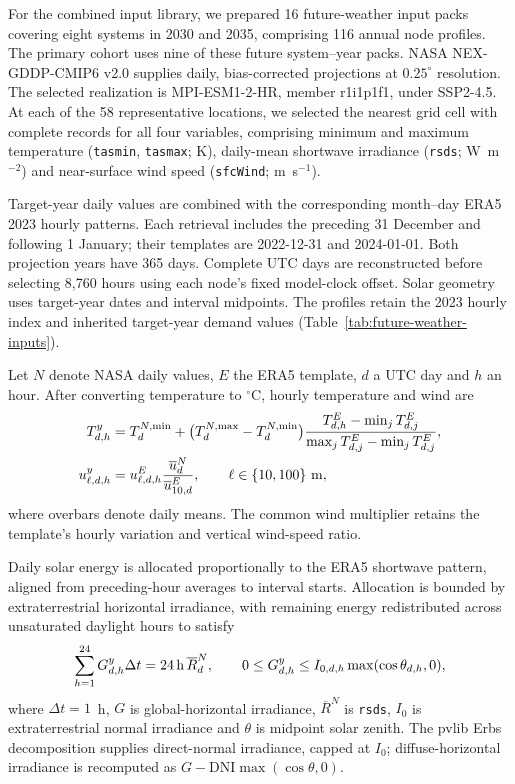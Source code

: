 \documentclass[pdflatex,sn-nature]{sn-jnl}
\begin{document}
For the combined input library, we prepared 16 future-weather input packs covering eight systems in 2030 and 2035, comprising 116 annual node profiles. The primary cohort uses nine of these future system--year packs. NASA NEX-GDDP-CMIP6 v2.0 supplies daily, bias-corrected projections at $0.25^\circ$ resolution\cite{nasa2022nexcmip6,nasa2025nexv2}. The selected realization is MPI-ESM1-2-HR, member r1i1p1f1, under SSP2-4.5. At each of the 58 representative locations, we selected the nearest grid cell with complete records for all four variables, comprising minimum and maximum temperature (\texttt{tasmin}, \texttt{tasmax}; K), daily-mean shortwave irradiance (\texttt{rsds}; W~m$^{-2}$) and near-surface wind speed (\texttt{sfcWind}; m~s$^{-1}$).

Target-year daily values are combined with the corresponding month--day ERA5 2023 hourly patterns\cite{era5,openmeteo}. Each retrieval includes the preceding 31 December and following 1 January; their templates are 2022-12-31 and 2024-01-01. Both projection years have 365 days. Complete UTC days are reconstructed before selecting 8,760 hours using each node's fixed model-clock offset. Solar geometry uses target-year dates and interval midpoints. The profiles retain the 2023 hourly index and inherited target-year demand values (Table~\ref{tab:future-weather-inputs}).

Let $N$ denote NASA daily values, $E$ the ERA5 template, $d$ a UTC day and $h$ an hour. After converting temperature to $^\circ$C, hourly temperature and wind are
\begin{align}
T^{y}_{d,h}&=T^{N,\min}_{d}
+\bigl(T^{N,\max}_{d}-T^{N,\min}_{d}\bigr)
\frac{T^{E}_{d,h}-\min_j T^{E}_{d,j}}
{\max_j T^{E}_{d,j}-\min_j T^{E}_{d,j}},\label{eq:future-temperature}\\
u^{y}_{\ell,d,h}&=u^{E}_{\ell,d,h}
\frac{\overline{u}^{N}_{d}}{\overline{u}^{E}_{10,d}},
\qquad \ell\in\{10,100\}\ {\rm m},\label{eq:future-wind}
\end{align}
where overbars denote daily means. The common wind multiplier retains the template's hourly variation and vertical wind-speed ratio.

Daily solar energy is allocated proportionally to the ERA5 shortwave pattern, aligned from preceding-hour averages to interval starts. Allocation is bounded by extraterrestrial horizontal irradiance, with remaining energy redistributed across unsaturated daylight hours to satisfy
\begin{equation}
\sum_{h=1}^{24}G^{y}_{d,h}\Delta t
=24\,{\rm h}\,\overline{R}^{N}_{d},\qquad
0\leq G^{y}_{d,h}\leq I_{0,d,h}\max(\cos\theta_{d,h},0),
\label{eq:future-radiation}
\end{equation}
where $\Delta t=1$~h, $G$ is global-horizontal irradiance, $\overline R^N$ is \texttt{rsds}, $I_0$ is extraterrestrial normal irradiance and $\theta$ is midpoint solar zenith. The pvlib Erbs decomposition supplies direct-normal irradiance, capped at $I_0$; diffuse-horizontal irradiance is recomputed as $G-\mathrm{DNI}\max(\cos\theta,0)$.
\end{document}
